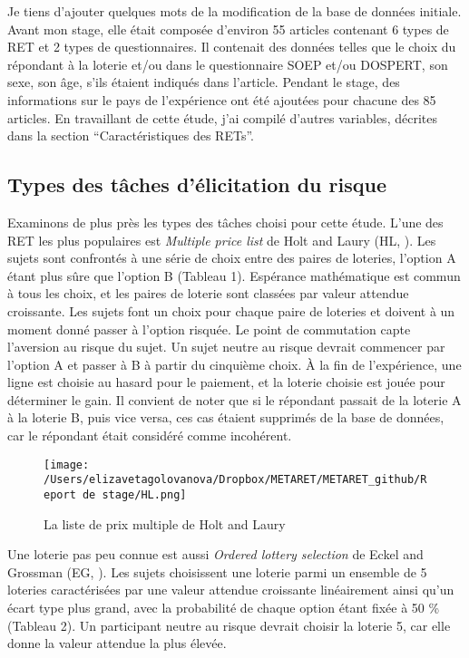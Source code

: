 \documentclass[12pt]{article}
\begin{document}
Je tiens d'ajouter quelques mots de la modification de la base de
données initiale. Avant mon stage, elle était composée d'environ 55
articles contenant 6 types de RET et 2 types de questionnaires. Il
contenait des données telles que le choix du répondant à la loterie
et/ou dans le questionnaire SOEP et/ou DOSPERT, son sexe, son âge, s'ils
étaient indiqués dans l'article. Pendant le stage, des informations sur
le pays de l'expérience ont été ajoutées pour chacune des 85 articles.
En travaillant de cette étude, j'ai compilé d'autres variables, décrites
dans la section ``Caractéristiques des RETs''.

\subsection{Types des tâches d'élicitation du risque}

Examinons de plus près les types des tâches choisi pour cette étude.
L'une des RET les plus populaires est \emph{Multiple price list} de Holt
and Laury (HL, \citet{Holt2002}). Les sujets sont confrontés à une série
de choix entre des paires de loteries, l'option A étant plus sûre que
l'option B (Tableau 1). Espérance mathématique est commun à tous les
choix, et les paires de loterie sont classées par valeur attendue
croissante. Les sujets font un choix pour chaque paire de loteries et
doivent à un moment donné passer à l'option risquée. Le point de
commutation capte l'aversion au risque du sujet. Un sujet neutre au
risque devrait commencer par l'option A et passer à B à partir du
cinquième choix. À la fin de l'expérience, une ligne est choisie au
hasard pour le paiement, et la loterie choisie est jouée pour déterminer
le gain. Il convient de noter que si le répondant passait de la loterie
A à la loterie B, puis vice versa, ces cas étaient supprimés de la base
de données, car le répondant était considéré comme incohérent.

\begin{figure}
\centering
\texttt{[image: /Users/elizavetagolovanova/Dropbox/METARET/METARET\_github/Report de stage/HL.png]}
\caption{La liste de prix multiple de Holt and Laury}
\end{figure}

Une loterie pas peu connue est aussi \emph{Ordered lottery selection} de
Eckel and Grossman (EG, \citet{Eckel2002}). Les sujets choisissent une
loterie parmi un ensemble de 5 loteries caractérisées par une valeur
attendue croissante linéairement ainsi qu'un écart type plus grand, avec
la probabilité de chaque option étant fixée à 50 \% (Tableau 2). Un
participant neutre au risque devrait choisir la loterie 5, car elle
donne la valeur attendue la plus élevée.
\end{document}
